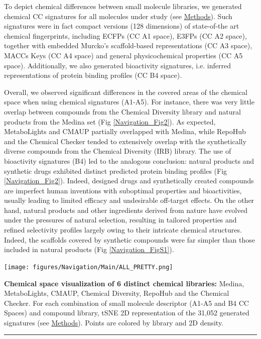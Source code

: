 To depict chemical differences between small molecule libraries, we generated chemical CC signatures for all molecules under study (see \hyperref[Navigation_Methods]{Methods}). Such signatures were in fact compact versions (128 dimensions) of state-of-the art chemical fingerprints, including ECFPs (CC A1 space), E3FPs (CC A2 space), together with embedded Murcko’s scaffold-based representations (CC A3 space), MACCs Keys (CC A4 space) and general physicochemical properties (CC A5 space). Additionally, we also generated bioactivity signatures, i.e. inferred representations of protein binding profiles (CC B4 space). 

Overall, we observed significant differences in the covered areas of the chemical space when using chemical signatures (A1-A5). For instance, there was very little overlap between compounds from the Chemical Diversity library and natural products from the Medina set (Fig \ref{Navigation_Fig2}). As expected, MetaboLights and CMAUP partially overlapped with Medina, while RepoHub and the Chemical Checker tended to extensively overlap with the synthetically diverse compounds from the Chemical Diversity (IRB) library. The use of bioactivity signatures (B4) led to the analogous conclusion: natural products and synthetic drugs exhibited distinct predicted protein binding profiles (Fig \ref{Navigation_Fig2}). Indeed, designed drugs and synthetically created compounds are imperfect human inventions with suboptimal properties and bioactivities, usually leading to limited efficacy and undesirable off-target effects. On the other hand, natural products and other ingredients derived from nature have evolved under the pressures of natural selection, resulting in tailored properties and refined selectivity profiles largely owing to their intricate chemical structures. Indeed, the scaffolds covered by synthetic compounds were far simpler than those included in natural products (Fig \ref{Navigation_FigS1}). 




\begin{Figure_modified}
  \centering
  \texttt{[image: figures/Navigation/Main/ALL\_PRETTY.png]}
  \caption{\textbf{Chemical space visualization of 6 distinct chemical libraries:} Medina, MetaboLights\cite{yurekten_metabolights_2024, haug_metabolights_2019}, CMAUP\cite{hou_cmaup_2024, zeng_cmaup_2019}, Chemical Diversity, RepoHub\cite{corsello_drug_2017} and the Chemical Checker\cite{duran-frigola_extending_2020}. For each combination of small molecule descriptor (A1-A5 and B4 CC Spaces) and compound library, tSNE 2D representation of the 31,052 generated signatures (see \hyperref[Navigation_Methods]{Methods}). Points are colored by library and 2D density.
}
  \vspace{-5mm}
  \rule[0ex]{\textwidth}{0.5pt}
  \vspace{-9mm}
  \label{Navigation_Fig2}
\end{Figure_modified}

